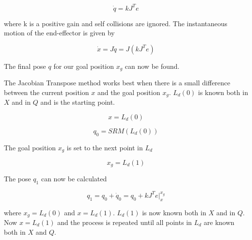 \begin{equation}
\dot{q} = kJ^Te
\end{equation}

where k is a positive gain and self collisions are ignored.  The instantaneous motion of the end-effector is given by

\begin{equation}
\dot{x} = J\dot{q} = J(kJ^Te)
\end{equation}

The final pose $q$ for our goal position $x_g$ can now be found.

The Jacobian Transpose method works best when there is a small difference between the current position $x$ and the goal position $x_g$.  $L_d(0)$ is known both in $X$ and in $Q$ and is the starting point.

\begin{equation}
x = L_d(0)
\end{equation}

\begin{equation}
q_0 = SRM  \left( L_d(0) \right)
\end{equation}

The goal position $x_g$ is set to the next point in $L_d$

\begin{equation}
x_g = L_d(1)
\end{equation}

The pose $q_1$ can now be calculated

\begin{equation}
q_1 = q_0 + \dot{q}_0 = q_0 + kJ^Te|_{x}^{x_g}
\end{equation}

where $x_g = L_d(0)$ and $x = L_d(1)$.  $L_d(1)$ is now known both in $X$ and in $Q$.  Now $x = L_d(1)$ and the process is repeated until all points in $L_d$ are known both in $X$ and $Q$.





